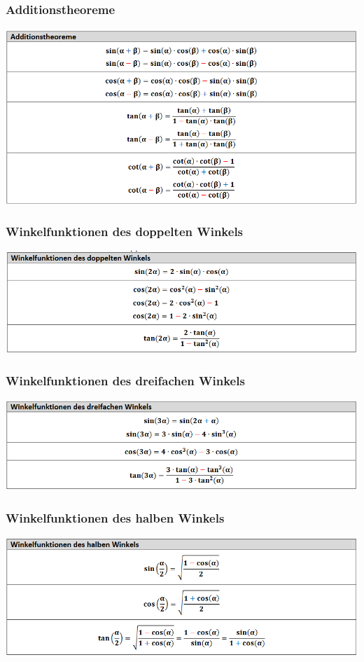 \subsubsection{Additionstheoreme}
\includegraphics[scale=0.7]{gon2.PNG}

\subsubsection{Winkelfunktionen des doppelten Winkels}
\includegraphics[scale=0.7]{gon3.PNG}

\subsubsection{Winkelfunktionen des dreifachen Winkels}
\includegraphics[scale=0.7]{gon4.PNG}

\subsubsection{Winkelfunktionen des halben Winkels}
\includegraphics[scale=0.7]{gon5.PNG}

